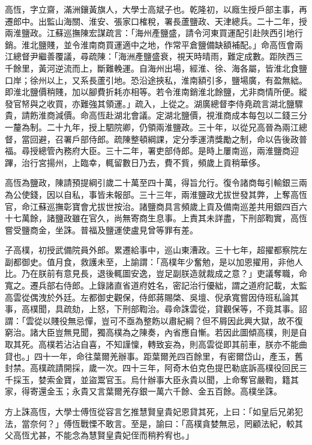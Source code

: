 \begin{pinyinscope}
高恆，字立齋，滿洲鑲黃旗人，大學士高斌子也。乾隆初，以廕生授戶部主事，再遷郎中。出監山海關、淮安、張家口榷稅，署長蘆鹽政、天津總兵。二十二年，授兩淮鹽政。江蘇巡撫陳宏謀疏言：「海州產鹽盛，請令河東買運配引赴陜西引地行銷。淮北鹽賤，並令淮南商買運適中之地，作常平倉鹽備缺額補配。」命高恆會兩江總督尹繼善覆議，尋疏陳：「海洲產鹽盛衰，視天時晴雨，難定成數。距陜西三千餘里，黃河逆流而上，斷難輓運。自海州出場，經淮、徐、海各屬，皆淮北食鹽口岸；徐州以上，又系長蘆引地。恐沿途挾私，淮南額引多，鹽場廣，有盈無絀。即淮北鹽價稍賤，加以腳費折耗亦相等。若令淮南銷淮北餘鹽，尤非商情所便。縱發官帑與之收買，亦難強其領運。」疏入，上從之。湖廣總督李侍堯疏言湖北鹽驟貴，請飭淮商減價。命高恆赴湖北會議。定湖北鹽價，視淮商成本每包以二錢三分一釐為制。二十九年，授上駟院卿，仍領兩淮鹽政。三十年，以從兄高晉為兩江總督，當回避，召署戶部侍郎。疏陳整頓綱課，定分季運清獎勵之制，命以告後政普福。尋授總管內務府大臣。三十二年，署吏部侍郎。是時上屢南巡，兩淮鹽商迎蹕，治行宮揚州，上臨幸，輒留數日乃去，費不貲，頻歲上貢稍華侈。

高恆為鹽政，陳請預提綱引歲二十萬至四十萬，得旨允行。復令諸商每引輸銀三兩為公使錢，因以自私，事皆未報部。三十三年，兩淮鹽政尤拔世發其弊，上奪高恆官，命江蘇巡撫彰寶會尤拔世按治。諸鹽商具言頻歲上貢及備南巡差共用銀四百六十七萬餘，諸鹽政雖在官久，尚無寄商生息事。上責其未詳盡，下刑部鞫實，高恆嘗受鹽商金，坐誅。普福及鹽運使盧見曾等罪有差。

子高樸，初授武備院員外郎。累遷給事中，巡山東漕政。三十七年，超擢都察院左副都御史。值月食，救護未至，上諭謂：「高樸年少奮勉，是以加恩擢用，非他人比。乃在朕前有意見長，退後輒圖安逸，豈足副朕造就裁成之意？」吏議奪職，命寬之。遷兵部右侍郎。上錄諸直省道府姓名，密記治行優絀，謂之道府記載，太監高雲從偶洩於外廷。左都御史觀保，侍郎蔣賜棨、吳壇、倪承寬嘗因侍班私論其事，高樸聞，具疏劾，上怒，下刑部鞫治。尋命誅雲從，貸觀保等，不竟其事。詔謂：「雲從以賤役無忌憚，豈可不亟為整飭以肅紀綱？但不屑因此興大獄，故不復窮治。諸大臣豈無見聞，獨高樸為之陳奏，內省應自慚。若因此圖傾高樸，則是自取其死。高樸若沾沾自喜，不知謹懍，轉致妄為，則高雲從即其前車，朕亦不能曲貸也。」四十一年，命往葉爾羌辦事。距葉爾羌四百餘里，有密爾岱山，產玉，舊封禁。高樸疏請開採，歲一次。四十三年，阿奇木伯克色提巴勒底訴高樸役回民三千採玉，婪索金寶，並盜鬻官玉。烏什辦事大臣永貴以聞，上命奪官嚴鞫，籍其家，得寄還金玉；永貴又言葉爾羌存銀一萬六千餘、金五百餘。高樸坐誅。

方上誅高恆，大學士傅恆從容言乞推慧賢皇貴妃恩貸其死，上曰：「如皇后兄弟犯法，當奈何？」傅恆戰慄不敢言。至是，諭曰：「高樸貪婪無忌，罔顧法紀，較其父高恆尤甚，不能念為慧賢皇貴妃侄而稍矜宥也。」


\end{pinyinscope}
